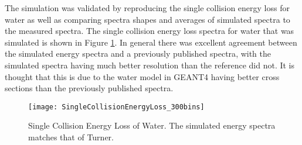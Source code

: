 \documentclass[draftcls,onecolumn]{IEEEtran}
\begin{document}
The simulation was validated by reproducing the single collision energy loss for water as well as comparing spectra shapes and averages of simulated spectra to the measured spectra.
The single collision energy loss spectra for water that was simulated is shown in Figure \ref{fig:SingleCollisionELossWater}.
In general there was excellent agreement between the simulated energy spectra and a previously published spectra\cite{turner_comparative_1982}, with the simulated spectra having much better resolution than the reference did not.
It is thought that this is due to the water model in GEANT4 having better cross sections than the previously published spectra.
\begin{figure}[ht]
  \centering
  \texttt{[image: SingleCollisionEnergyLoss\_300bins]}
  \caption{Single Collision Energy Loss of Water. The simulated energy spectra matches that of Turner\cite{turner_comparative_1982}.}
	\label{fig:SingleCollisionELossWater}
\end{figure}
\end{document}
